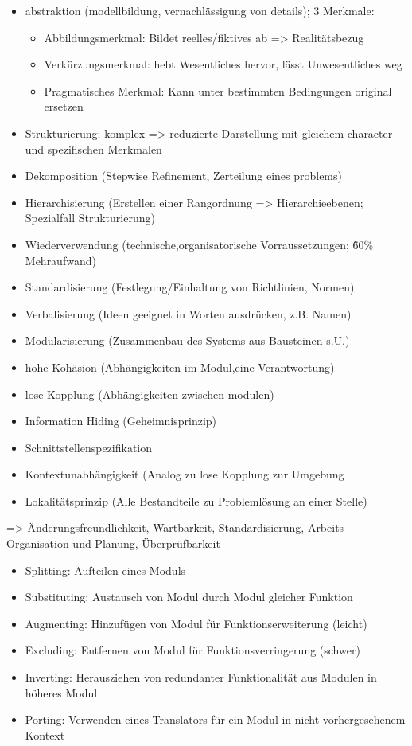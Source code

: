 \begin{itemize}
\item abstraktion (modellbildung, vernachlässigung von details); 3 Merkmale:
	\begin{itemize}
		 \item Abbildungsmerkmal: Bildet reelles/fiktives ab => Realitätsbezug
		 \item Verkürzungsmerkmal: hebt Wesentliches hervor, lässt Unwesentliches weg
		 \item Pragmatisches Merkmal: Kann unter bestimmten Bedingungen original ersetzen
	\end{itemize}
\item Strukturierung: komplex => reduzierte Darstellung mit gleichem character und spezifischen Merkmalen
\item Dekomposition (Stepwise Refinement, Zerteilung eines problems)
\item Hierarchisierung (Erstellen einer Rangordnung => Hierarchieebenen; Spezialfall Strukturierung)
\item Wiederverwendung (technische,organisatorische Vorraussetzungen; \~60\% Mehraufwand)
\item Standardisierung (Festlegung/Einhaltung von Richtlinien, Normen)
\item Verbalisierung (Ideen geeignet in Worten ausdrücken, z.B. Namen)
\item Modularisierung (Zusammenbau des Systems aus Bausteinen s.U.)
\end{itemize}

\begin{itemize}
\item hohe Kohäsion (Abhängigkeiten im Modul,eine Verantwortung)
\item lose Kopplung (Abhängigkeiten zwischen modulen)
\item Information Hiding (Geheimnisprinzip)
\item Schnittstellenspezifikation
\item Kontextunabhängigkeit (Analog zu lose Kopplung zur Umgebung
\item Lokalitätsprinzip (Alle Bestandteile zu Problemlösung an einer Stelle)
\end{itemize}
=> Änderungsfreundlichkeit, Wartbarkeit, Standardisierung, Arbeits- Organisation und Planung, Überprüfbarkeit

\begin{itemize}
\item Splitting: Aufteilen eines Moduls
\item Substituting: Austausch von Modul durch Modul gleicher Funktion
\item Augmenting: Hinzufügen von Modul für Funktionserweiterung (leicht)
\item Excluding: Entfernen von Modul für Funktionsverringerung (schwer)
\item Inverting: Herausziehen von redundanter Funktionalität aus Modulen in höheres Modul
\item Porting: Verwenden eines Translators für ein Modul in nicht vorhergesehenem Kontext
\end{itemize}

